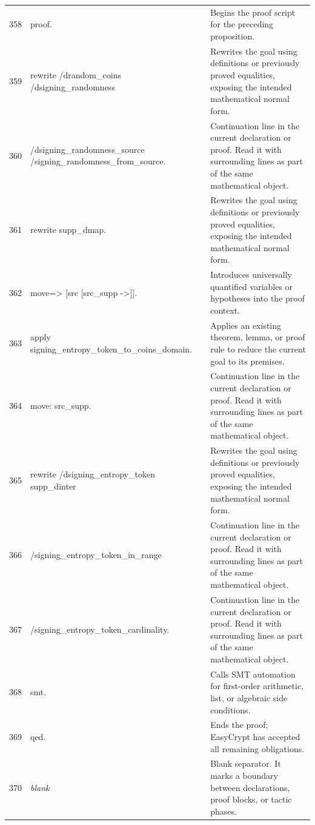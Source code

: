 \documentclass[10pt]{article}
\begin{document}
\begin{longtable}{r L{0.53\textwidth} L{0.37\textwidth}}
358 & {\ttfamily\scriptsize proof.} & Begins the proof script for the preceding proposition. \\
359 & {\ttfamily\scriptsize rewrite /drandom\_coins /dsigning\_randomness} & Rewrites the goal using definitions or previously proved equalities, exposing the intended mathematical normal form. \\
360 & {\ttfamily\scriptsize         /dsigning\_randomness\_source /signing\_randomness\_from\_source.} & Continuation line in the current declaration or proof.  Read it with surrounding lines as part of the same mathematical object. \\
361 & {\ttfamily\scriptsize rewrite supp\_dmap.} & Rewrites the goal using definitions or previously proved equalities, exposing the intended mathematical normal form. \\
362 & {\ttfamily\scriptsize move=> [src [src\_supp ->]].} & Introduces universally quantified variables or hypotheses into the proof context. \\
363 & {\ttfamily\scriptsize apply signing\_entropy\_token\_to\_coins\_domain.} & Applies an existing theorem, lemma, or proof rule to reduce the current goal to its premises. \\
364 & {\ttfamily\scriptsize move: src\_supp.} & Continuation line in the current declaration or proof.  Read it with surrounding lines as part of the same mathematical object. \\
365 & {\ttfamily\scriptsize rewrite /dsigning\_entropy\_token supp\_dinter} & Rewrites the goal using definitions or previously proved equalities, exposing the intended mathematical normal form. \\
366 & {\ttfamily\scriptsize         /signing\_entropy\_token\_in\_range} & Continuation line in the current declaration or proof.  Read it with surrounding lines as part of the same mathematical object. \\
367 & {\ttfamily\scriptsize         /signing\_entropy\_token\_cardinality.} & Continuation line in the current declaration or proof.  Read it with surrounding lines as part of the same mathematical object. \\
368 & {\ttfamily\scriptsize smt.} & Calls SMT automation for first-order arithmetic, list, or algebraic side conditions. \\
369 & {\ttfamily\scriptsize qed.} & Ends the proof; EasyCrypt has accepted all remaining obligations. \\
370 & {\ttfamily\scriptsize \emph{blank}} & Blank separator.  It marks a boundary between declarations, proof blocks, or tactic phases. \\

\end{longtable}
\end{document}
